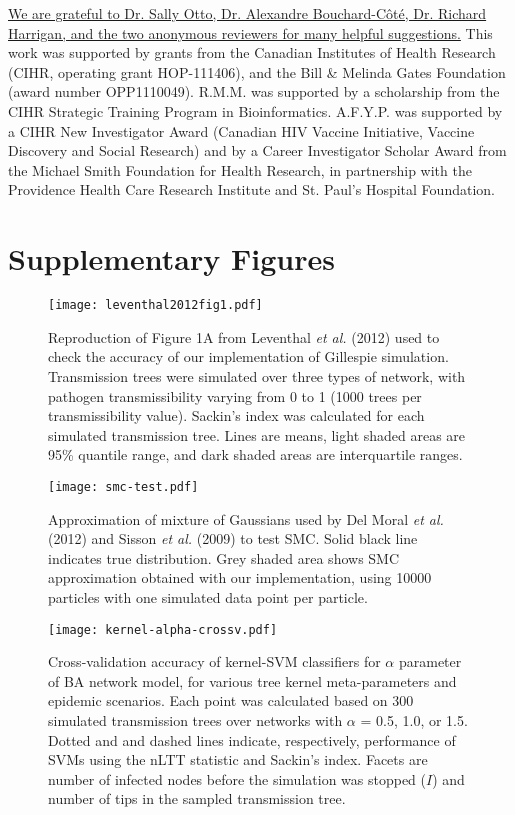 \documentclass[12pt]{article}\usepackage[]{graphicx}\usepackage[]{color}
\newcommand{\add}[1]{\color{blue} \uline{#1} \color{black}}
\begin{document}
\add{We are grateful to Dr. Sally Otto, Dr. Alexandre Bouchard-C\^ot\'e, 
Dr. Richard Harrigan, and the two anonymous reviewers for many helpful
suggestions.} This work was supported by grants from the Canadian Institutes of
Health Research (CIHR, operating grant HOP-111406), and the Bill \& Melinda
Gates Foundation (award number OPP1110049). R.M.M. was supported by a
scholarship from the CIHR Strategic Training Program in Bioinformatics.
A.F.Y.P. was supported by a CIHR New Investigator Award (Canadian HIV Vaccine
Initiative, Vaccine Discovery and Social Research) and by a Career Investigator
Scholar Award from the Michael Smith Foundation for Health Research, in
partnership with the Providence Health Care Research Institute and St. Paul's
Hospital Foundation.

\clearpage
\printbibliography
\newpage

\section*{Supplementary Figures}

\renewcommand{\thefigure}{S\arabic{figure}}
\setcounter{figure}{0}
\setcounter{page}{1}

\begin{figure}[ht]
  \centering
  \texttt{[image: leventhal2012fig1.pdf]}
  \caption{
    Reproduction of Figure 1A from Leventhal \textit{et al.} (2012) used to
    check the accuracy of our implementation of Gillespie simulation.
    Transmission trees were simulated over three types of network, with
    pathogen transmissibility varying from 0 to 1 (1000 trees per
    transmissibility value). Sackin's index was calculated for each simulated
    transmission tree. Lines are means, light shaded areas are 95\% quantile
    range, and dark shaded areas are interquartile ranges. 
    }
  \label{fig:leventhal}
\end{figure}

\begin{figure}[ht]
  \centering
  \texttt{[image: smc-test.pdf]}
  \caption{Approximation of mixture of Gaussians used by
    Del Moral \textit{et al.} (2012) and Sisson \textit{et al.} (2009) to test
    SMC. Solid black line indicates true distribution. Grey shaded area shows
    SMC approximation obtained with our implementation, using 10000
    particles with one simulated data point per particle.
  }
  \label{fig:smctest}
\end{figure}

\begin{figure}[ht]
  \centering
  \texttt{[image: kernel-alpha-crossv.pdf]}
  \caption{
    Cross-validation accuracy of kernel-SVM classifiers for $\alpha$ parameter
    of BA network model, for various tree kernel meta-parameters and
    epidemic scenarios. Each point was calculated based on 300 simulated
    transmission trees over networks with $\alpha$ = 0.5, 1.0, or 1.5. Dotted
    and and dashed lines indicate, respectively, performance of SVMs using the
    nLTT statistic and Sackin's index. Facets are number of infected nodes
    before the simulation was stopped ($I$) and number of tips in the sampled
    transmission tree.
  }
  \label{fig:alphacrossv}
\end{figure}
\end{document}

